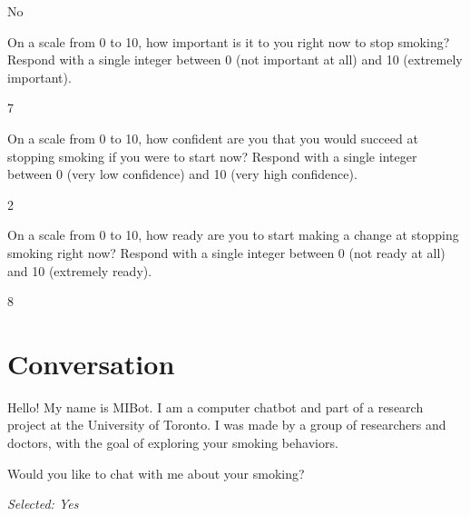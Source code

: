 \begin{clientbox}
	No
\end{clientbox}

\begin{researcherbox}
	On a scale from 0 to 10, how important is it to you right now to stop smoking? Respond with a single integer between 0 (not important at all) and 10 (extremely important).
\end{researcherbox}

\begin{clientbox}
	7
\end{clientbox}

\begin{researcherbox}
	On a scale from 0 to 10, how confident are you that you would succeed at stopping smoking if you were to start now? Respond with a single integer between 0 (very low confidence) and 10 (very high confidence).
\end{researcherbox}

\begin{clientbox}
	2
\end{clientbox}

\begin{researcherbox}
	On a scale from 0 to 10, how ready are you to start making a change at stopping smoking right now? Respond with a single integer between 0 (not ready at all) and 10 (extremely ready).
\end{researcherbox}

\begin{clientbox}
	8
\end{clientbox}

\section*{Conversation}

\begin{counsellorbox}
        Hello! My name is MIBot. I am a computer chatbot and part of a research project at the University of Toronto. I was made by a group of researchers and doctors, with the goal of exploring your smoking behaviors.
\end{counsellorbox}

\begin{counsellorbox}
	Would you like to chat with me about your smoking?
\end{counsellorbox}

\begin{clientbox}
	\textit{Selected: Yes}
\end{clientbox}


